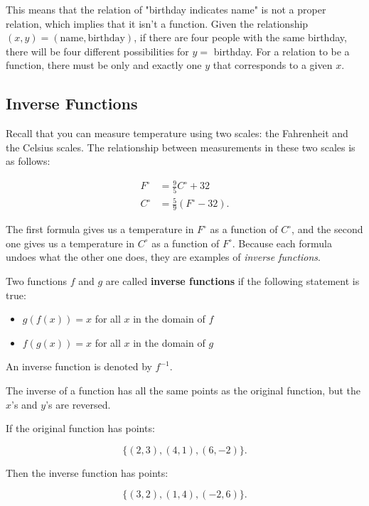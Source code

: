 This means that the relation of "birthday indicates name" is not a proper
relation, which implies that it isn't a function. Given the relationship $(x,
y) = (\textrm{name}, \textrm{birthday})$, if there are four people with the
same birthday, there will be four different possibilities for $y =$ birthday.
For a relation to be a function, there must be only and exactly one  $y$ that
corresponds to a given $x$.


\subsection{Inverse Functions}
\label{sub_sec:inverse_functions}

Recall that you can measure temperature using two scales: the Fahrenheit and the Celsius scales. The relationship between measurements in these two scales is as follows:

\begin{align*}
  F^{\circ} &= \frac{9}{5}C^{\circ} + 32 \\
  C^{\circ} &= \frac{5}{9}(F^{\circ} - 32).
\end{align*}

The first formula gives us a temperature in $F^{\circ}$ as a function of
$C^{\circ}$, and the second one gives us a temperature in $C^{\circ}$ as a
function of $F^{\circ}$. Because each formula undoes what the other one does,
they are examples of \textit{inverse functions}.

\begin{definition}
  \label{def:inverse_functions}

  Two functions $f$ and $g$ are called \textbf{inverse functions} if the
  following statement is true:

  \begin{itemize}
    \item $g(f(x)) = x$ for all $x$ in the domain of $f$
    \item $f(g(x)) = x$ for all $x$ in the domain of $g$
  \end{itemize}

  An inverse function is denoted by $f^{-1}$.
\end{definition}

The inverse of a function has all the same points as the original function, but
the $x$'s and $y$'s are reversed.

\begin{example}
  If the original function has points:

  \[ \{ (2,3), (4,1), (6,-2) \} . \]

  Then the inverse function has points:

  \[ \{ (3,2), (1,4), (-2,6) \} . \]
\end{example}

